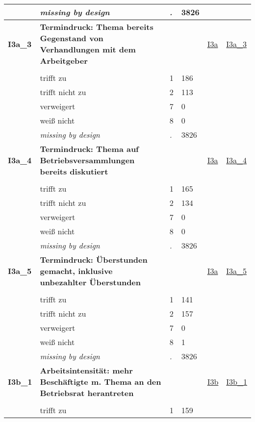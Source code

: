 \begin{longtable}{| L{2.45cm} | L{6cm} | C{1.5cm} | R{1cm} | C{2.25cm} | C{2.25cm} |}
   & \textit{missing by design} & \textit{.} & 3826 &  &  \\ 
   \midrule
\textbf{I3a\_3}\label{var:I3a:3} & \textbf{Termindruck: Thema bereits Gegenstand von Verhandlungen mit dem Arbeitgeber} &  &  & \hyperref[I3a]{I3a} & \hyperref[var:suf:I3a:3]{I3a\_3} \\ 
   &  &  &  &  &  \\ 
   & trifft zu & 1 & 186 &  &  \\ 
   & trifft nicht zu & 2 & 113 &  &  \\ 
   & verweigert & 7 & 0 &  &  \\ 
   & weiß nicht & 8 & 0 &  &  \\ 
   & \textit{missing by design} & \textit{.} & 3826 &  &  \\ 
   \midrule
\textbf{I3a\_4}\label{var:I3a:4} & \textbf{Termindruck: Thema auf Betriebsversammlungen bereits diskutiert} &  &  & \hyperref[I3a]{I3a} & \hyperref[var:suf:I3a:4]{I3a\_4} \\ 
   &  &  &  &  &  \\ 
   & trifft zu & 1 & 165 &  &  \\ 
   & trifft nicht zu & 2 & 134 &  &  \\ 
   & verweigert & 7 & 0 &  &  \\ 
   & weiß nicht & 8 & 0 &  &  \\ 
   & \textit{missing by design} & \textit{.} & 3826 &  &  \\ 
   \midrule
\textbf{I3a\_5}\label{var:I3a:5} & \textbf{Termindruck: Überstunden gemacht, inklusive unbezahlter Überstunden} &  &  & \hyperref[I3a]{I3a} & \hyperref[var:suf:I3a:5]{I3a\_5} \\ 
   &  &  &  &  &  \\ 
   & trifft zu & 1 & 141 &  &  \\ 
   & trifft nicht zu & 2 & 157 &  &  \\ 
   & verweigert & 7 & 0 &  &  \\ 
   & weiß nicht & 8 & 1 &  &  \\ 
   & \textit{missing by design} & \textit{.} & 3826 &  &  \\ 
   \midrule
\textbf{I3b\_1}\label{var:I3b:1} & \textbf{Arbeitsintensität: mehr Beschäftigte m. Thema an den Betriebsrat herantreten} &  &  & \hyperref[I3b]{I3b} & \hyperref[var:suf:I3b:1]{I3b\_1} \\ 
   &  &  &  &  &  \\ 
   & trifft zu & 1 & 159 &  &  \\ 

\end{longtable}
